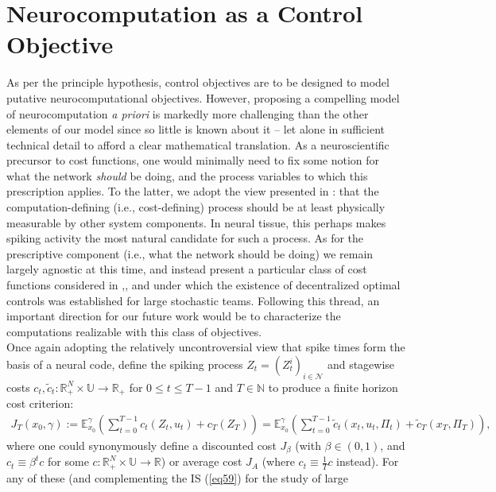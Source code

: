 \documentclass[12pt, oneside]{report}
\newcommand{\E}{\mathbb{E}}
\newcommand{\mbb}[1]{\mathbb{#1}}
\newcommand{\1}[1]{\mathbbm{1}_{\{#1\}}}
\newcommand{\mc}[1]{\mathcal{#1}}
\theoremstyle{definition}
\begin{document}
\section{Neurocomputation as a Control Objective}
\indent As per the principle hypothesis, control objectives are to be designed to model putative neurocomputational objectives. However, proposing a compelling model of neurocomputation \textit{a priori} is markedly more challenging than the other elements of our model
since so little is known about it -- let alone in sufficient technical detail to afford a clear mathematical translation. As a neuroscientific precursor to cost functions, one would minimally need to fix some notion for what the network {\it should} be doing, and the
process variables to which this prescription applies. To the latter, we adopt the view presented in \cite{Jaeger_Noheda_vanderWiel_2023}: that the computation-defining (i.e., cost-defining) process should be at least physically measurable by other system components. In neural tissue,
this perhaps makes spiking activity the most natural candidate for such a process. As for the prescriptive component (i.e., what the network should be doing) we remain largely agnostic at this time, and instead present a particular class of cost functions considered in \cite[ch.6]{Yuksel_Basar_2024},\cite{Sanjari_Saldi_Yüksel_2024},
and under which the existence of decentralized optimal controls was established for large stochastic teams. Following this thread, an important direction for our future work would be to characterize the computations realizable with this class of objectives.\\[5pt]
\indent Once again adopting the relatively uncontroversial view that spike times form the basis of a neural code, define the spiking process $Z_t=(Z^i_t)_{i\in\mc{N}}$
and stagewise costs $c_t,\tilde{c}_t:\mbb{R}_+^{N}\times\mbb{U}\rightarrow\mbb{R}_+$ for $0\leq t\leq T-1$ and $T\in\mbb{N}$
to produce a finite horizon cost criterion:
\begin{align}
    J_T(x_0,\gamma):=\E^\gamma_{x_0}\left(\sum_{t=0}^{T-1}c_t(Z_t,u_t)+c_T(Z_T)\right)=\E^\gamma_{x_0}\left(\sum_{t=0}^{T-1}\tilde{c}_t(x_t,u_t,\Pi_t)+\tilde{c}_T(x_T,\Pi_T)\right),\label{eq60}
\end{align}
where one could synonymously define a discounted cost $J_\beta$ (with $\beta\in(0,1)$, and $c_t\equiv\beta^tc$ for some $c:\mbb{R}^N_+\times\mbb{U}\rightarrow\mbb{R}$) or average cost $J_A$ (where $c_t\equiv\frac{1}{T}c$ instead). For any of these (and complementing the IS (\ref{eq59}) for the study of large
\end{document}
